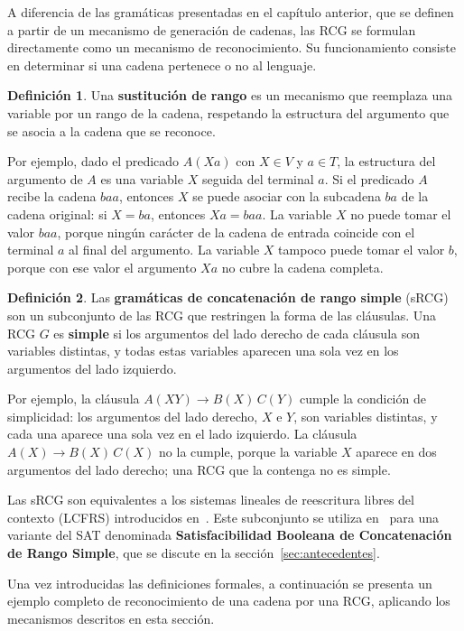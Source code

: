 \documentclass{report}
\theoremstyle{definition}
\newtheorem{definicion}{Definición}[chapter]
\theoremstyle{plain}
\theoremstyle{remark}
\begin{document}
A diferencia de las gramáticas presentadas en el capítulo anterior, que
se definen a partir de un mecanismo de generación de cadenas, las RCG
se formulan directamente como un mecanismo de reconocimiento. Su
funcionamiento consiste en determinar si una cadena pertenece o no al
lenguaje.

\begin{definicion}
Una \textbf{sustitución de rango} es un mecanismo que reemplaza una
variable por un rango de la cadena, respetando la estructura del
argumento que se asocia a la cadena que se reconoce.
\end{definicion}

Por ejemplo, dado el predicado $A(Xa)$ con $X \in V$ y $a \in T$, la
estructura del argumento de $A$ es una variable $X$ seguida del
terminal $a$. Si el predicado $A$ recibe la cadena $baa$, entonces $X$
se puede asociar con la subcadena $ba$ de la cadena original: si
$X = ba$, entonces $Xa = baa$. La variable $X$ no puede tomar el valor
$baa$, porque ningún carácter de la cadena de entrada coincide con el
terminal $a$ al final del argumento. La variable $X$ tampoco puede
tomar el valor $b$, porque con ese valor el argumento $Xa$ no cubre la
cadena completa.

\begin{definicion}
Las \textbf{gramáticas de concatenación de rango simple} (sRCG) son un
subconjunto de las RCG que restringen la forma de las cláusulas. Una
RCG $G$ es \textbf{simple} si los argumentos del lado derecho de cada
cláusula son variables distintas, y todas estas variables aparecen una
sola vez en los argumentos del lado izquierdo.
\end{definicion}

Por ejemplo, la cláusula $A(XY) \to B(X)\, C(Y)$ cumple la condición de
simplicidad: los argumentos del lado derecho, $X$ e $Y$, son variables
distintas, y cada una aparece una sola vez en el lado izquierdo. La
cláusula $A(X) \to B(X)\, C(X)$ no la cumple, porque la variable $X$
aparece en dos argumentos del lado derecho; una RCG que la contenga no
es simple.

Las sRCG son equivalentes a los sistemas lineales de reescritura libres
del contexto (LCFRS) introducidos en~\cite{vijayshanker1987lcfrs}. Este
subconjunto se utiliza en~\cite{aguileralopez2016} para una variante
del SAT denominada \textbf{Satisfacibilidad Booleana de Concatenación
de Rango Simple}, que se discute en la sección~\ref{sec:antecedentes}.

Una vez introducidas las definiciones formales, a continuación se
presenta un ejemplo completo de reconocimiento de una cadena por una
RCG, aplicando los mecanismos descritos en esta sección.
\end{document}
